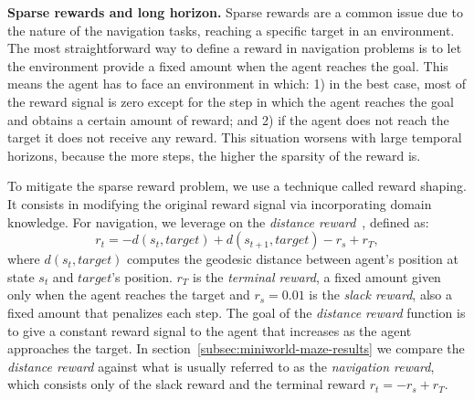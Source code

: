 \textbf{Sparse rewards and long horizon.}
Sparse rewards are a common issue due to the nature of the navigation tasks, \ie reaching a specific target in an environment.
The most straightforward way to define a reward in navigation problems is to let the environment provide a fixed amount when the agent reaches the goal.
This means the agent has to face an environment in which:
1) in the best case, most of the reward signal is zero except for the step in which the agent reaches the goal and obtains a certain amount of reward;
and 2) if the agent does not reach the target it does not receive any reward.
This situation worsens with large temporal horizons, because the more steps, the higher the sparsity of the reward is.

To mitigate the sparse reward problem, we use a technique called reward shaping.
It consists in modifying the original reward signal via incorporating domain knowledge.
For navigation, we leverage on the \textit{distance reward}~\cite{wijmans2020}, defined as:
\begin{equation}
    \label{eq:rew_shaping}
    r_t = -d(s_t, target) + d(s_{t+1}, target) - r_s + r_T,
\end{equation}
where $d(s_t, target)$ computes the geodesic distance between agent's position at state $s_t$ and $target$'s position.
$r_T$ is the \textit{terminal reward}, a fixed amount given only when the agent reaches the target and $r_s=0.01$ is the \textit{slack reward}, also a fixed amount that penalizes each step.
The goal of the \textit{distance reward} function is to give a constant reward signal to the agent that increases as the agent approaches the target.
In section~\ref{subsec:miniworld-maze-results} we compare the \textit{distance reward} against what is usually referred to as the \textit{navigation reward}, which consists only of the slack reward and the terminal reward $r_t = -r_s + r_T$.

